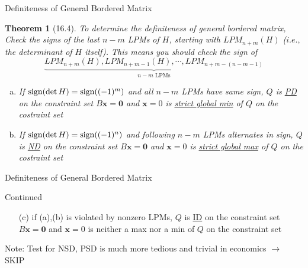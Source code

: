 \documentclass[a4paper,11pt]{article}
\newtheorem{thm}{Theorem}
\newcommand{\bd}{\mathbf}
\begin{document}
\begin{frame}[t]{Definiteness of General Bordered Matrix}
	\begin{thm}
		[16.4] To determine the definiteness of general bordered matrix, Check the signs of the last $n-m$ LPMs of $H$, starting with $LPM_{n+m}(H)$ ($i.e.,$ the determinant of $H$ itself). This means you should check the sign of \[
			\underbrace{LPM_{n+m}(H), LPM_{n+m-1}(H), \cdots,LPM_{n+m-(n-m-1)}}_{n-m\text{ LPMs}}
		\]
		\begin{enumerate}[(a)]
			\item If ${\rm sign}(\det H)={\rm sign}((-1)^m)$ and all $n-m$ LPMs have same sign, $Q$ is \uline{PD} on the constraint set $B\bd{x}=\bd{0}$ and $\bd{x}=0$ is \uline{strict global min} of $Q$ on the costraint set
			\item If ${\rm sign}(\det H)={\rm sign}((-1)^n)$ and following $n-m$ LPMs alternates in sign, $Q$ is \uline{ND} on the constraint set $B\bd{x}=\bd{0}$ and $\bd{x}=0$ is \uline{strict global max} of $Q$ on the costraint set
		\end{enumerate}
	\end{thm}
\end{frame}

\begin{frame}[t]{Definiteness of General Bordered Matrix}
	\begin{block}
		{Continued}
		\begin{enumerate}[(a)]
			\item [(c)] if (a),(b) is violated by nonzero LPMs, $Q$ is \uline{ID} on the constraint set $B\bd{x}=\bd{0}$ and $\bd{x}=0$ is neither a max nor a min of $Q$ on the constraint set
		\end{enumerate}
	\end{block}
	Note: Test for NSD, PSD is much more tedious and trivial in economics $\rightarrow$ SKIP
\end{frame}
\end{document}
